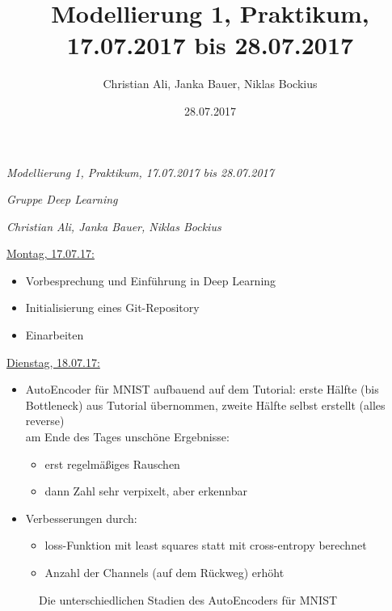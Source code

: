 \documentclass[10pt,a4paper]{report}
\title{Modellierung 1, Praktikum, 17.07.2017 bis 28.07.2017}
\author{Christian Ali, Janka Bauer, Niklas Bockius}
\date{28.07.2017}
\begin{document}
\textit{\large Modellierung 1, Praktikum, 17.07.2017 bis 28.07.2017}

\textit{Gruppe Deep Learning}

\textit{Christian Ali, Janka Bauer, Niklas Bockius}

\bigskip
\bigskip
\uline{Montag, 17.07.17:}
\begin{itemize}
	\item Vorbesprechung und Einführung in Deep Learning 
	\item Initialisierung eines Git-Repository 
	\item Einarbeiten
\end{itemize}

\bigskip	
\uline{Dienstag, 18.07.17:}
\begin{itemize}
\item AutoEncoder für MNIST aufbauend auf dem Tutorial: erste Hälfte (bis Bottleneck) aus Tutorial übernommen, zweite Hälfte selbst erstellt (alles reverse)\\
am Ende des Tages unschöne Ergebnisse:
	\begin{itemize}
	\item erst regelmäßiges Rauschen 
	\item dann Zahl sehr verpixelt, aber erkennbar 
	\end{itemize}
\item Verbesserungen durch:
	\begin{itemize}
	\item loss-Funktion mit least squares statt mit cross-entropy berechnet
	\item Anzahl der Channels (auf dem Rückweg) erhöht
	\end{itemize}  	                        
\end{itemize}

\begin{figure}[H]
\centering
{} 
\hspace{0.5cm}
\hspace{1.5cm}
\hspace{0.5cm}
\caption{Die unterschiedlichen Stadien des AutoEncoders für MNIST}
\end{figure}
\end{document}

